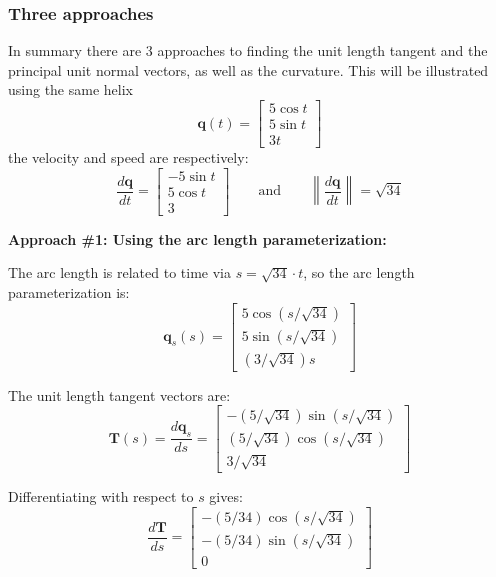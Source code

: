 \documentclass{article}
\begin{document}



\subsubsection*{Three approaches}

In summary there are 3 approaches to finding the unit length tangent and the principal unit normal vectors, as well as the curvature. This will be illustrated using the same helix 
\[\mathbf{q}(t) = \begin{bmatrix} 
5 \cos t \\  
5 \sin t \\ 
3t 
\end{bmatrix}\]  
the velocity and speed are respectively:
\[\frac{d\mathbf{q}}{dt} = \begin{bmatrix} 
-5 \sin t \\  
5 \cos t \\ 
3 
\end{bmatrix}
\quad\quad\text{and}\quad\quad
\left\|\frac{d\mathbf{q}}{dt}\right\| = \sqrt{34}\]


\textbf{Approach \#1: Using the arc length parameterization:}

The arc length is related to time via \(s = \sqrt{34} \cdot t\), so the arc length parameterization is:
\[\mathbf{q}_s(s) = \begin{bmatrix} 
5 \cos (s/\sqrt{34}) \\  
5 \sin (s/\sqrt{34}) \\ 
(3/\sqrt{34})s 
\end{bmatrix}\] 

The unit length tangent vectors are: 
\[\mathbf{T}(s) = \frac{d\mathbf{q}_s}{ds} = \begin{bmatrix} -(5/\sqrt{34})\sin(s/\sqrt{34}) \\ (5/\sqrt{34})\cos(s/\sqrt{34}) \\ 3/\sqrt{34} \end{bmatrix}\]

Differentiating with respect to \(s\) gives:
\[\frac{d\mathbf{T}}{ds} = \begin{bmatrix} -(5/34)\cos(s/\sqrt{34}) \\ -(5/34)\sin(s/\sqrt{34}) \\ 0 \end{bmatrix}\] 
\end{document}
